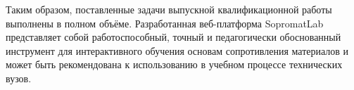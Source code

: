 Таким образом, поставленные задачи выпускной квалификационной работы выполнены в полном объёме. Разработанная веб-платформа SopromatLab представляет собой работоспособный, точный и педагогически обоснованный инструмент для интерактивного обучения основам сопротивления материалов и может быть рекомендована к использованию в учебном процессе технических вузов.





